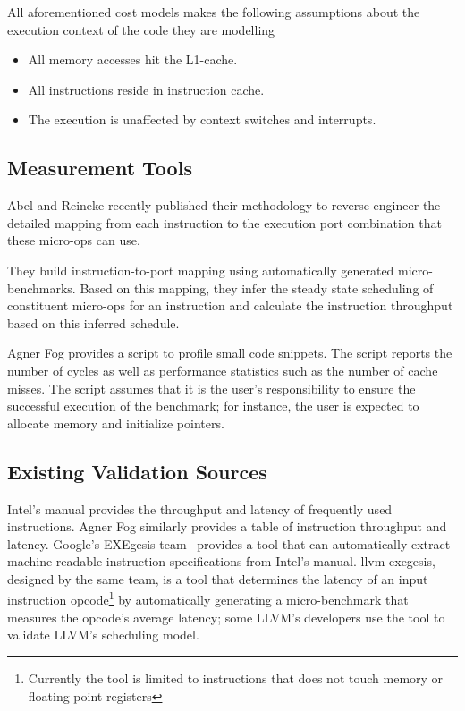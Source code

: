 \vspace{1em}
All aforementioned cost models makes the following assumptions about the execution context
of the code they are modelling
\begin{itemize}
    \item All memory accesses hit the L1-cache.
    \item All instructions reside in instruction cache.
    \item The execution is unaffected by context switches and interrupts.
\end{itemize}

\subsection{Measurement Tools}
Abel and Reineke\cite{uops} recently published their methodology
to reverse engineer the detailed mapping from each instruction to the execution port combination
that these micro-ops can use.

They build instruction-to-port mapping using automatically generated micro-benchmarks.
Based on this mapping, they infer the steady state scheduling of constituent
micro-ops for an instruction and calculate the instruction throughput based on
this inferred schedule.

Agner Fog\cite{agner} provides a script to profile small code snippets.
The script reports the number of cycles as well as performance statistics such as 
the number of cache misses.
The script assumes that it is the user's responsibility to ensure
the successful execution of the benchmark;
for instance, the user is expected to allocate memory and initialize pointers.


\subsection{Existing Validation Sources}
Intel's manual\cite{intel-manual} provides the throughput and latency
of frequently used instructions.
Agner Fog\cite{agner} similarly provides a table of instruction throughput and latency.
Google's EXEgesis team~\cite{exegesis} provides a tool that can automatically extract
machine readable instruction specifications from Intel's manual.
llvm-exegesis, designed by the same team, is a tool that determines
the latency of an input instruction opcode\footnote{
Currently the tool is limited to instructions that does not touch memory or floating point registers} 
by automatically generating a micro-benchmark that measures the opcode's average latency;
some LLVM's developers use the tool to validate LLVM's scheduling model.

